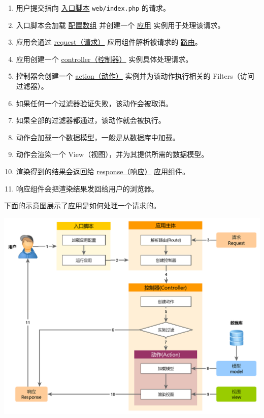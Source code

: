 \begin{enumerate}
\item 用户提交指向 \hyperref[structure-entry-scripts.md]{入口脚本} \lstinline|web/index.php| 的请求。
\item 入口脚本会加载 \hyperref[concept-configurations.md]{配置数组} 并创建一个
\hyperref[structure-applications.md]{应用} 实例用于处理该请求。
\item 应用会通过 \hyperref[runtime-requests.md]{request（请求）} 应用组件解析被请求的 \hyperref[runtime-routing.md]{路由}。
\item 应用创建一个 \hyperref[structure-controllers.md]{controller（控制器）} 实例具体处理请求。
\item 控制器会创建一个 \hyperref[structure-controllers.md]{action（动作）} 实例并为该动作执行相关的 Filters（访问过滤器）。
\item 如果任何一个过滤器验证失败，该动作会被取消。
\item 如果全部的过滤器都通过，该动作就会被执行。
\item 动作会加载一个数据模型，一般是从数据库中加载。
\item 动作会渲染一个 View（视图），并为其提供所需的数据模型。
\item 渲染得到的结果会返回给 \hyperref[runtime-responses.md]{response（响应）} 应用组件。
\item 响应组件会把渲染结果发回给用户的浏览器。
\end{enumerate}
下面的示意图展示了应用是如何处理一个请求的。

\noindent\includegraphics[width=\textwidth]{images/application-lifecycle.png}


